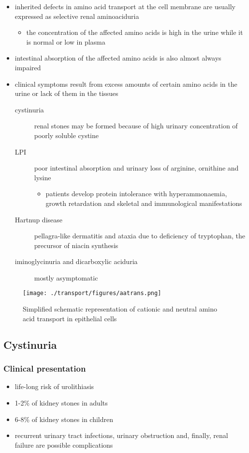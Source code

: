 \documentclass{scrartcl}
\begin{document}
\begin{itemize}
\item inherited defects in amino acid transport at the cell membrane are
usually expressed as selective renal aminoaciduria
\begin{itemize}
\item the concentration of the affected amino acids is high in the urine
while it is normal or low in plasma
\end{itemize}
\item intestinal absorption of the affected amino acids is also almost
always impaired
\item clinical symptoms result from excess amounts of certain amino acids
in the urine or lack of them in the tissues
\begin{description}
\item[{cystinuria}] renal stones may be formed because of high urinary
concentration of poorly soluble cystine
\item[{LPI}] poor intestinal absorption and urinary loss of arginine,
ornithine and lysine
\begin{itemize}
\item patients develop protein intolerance with hyperammonaemia,
growth retardation and skeletal and immunological manifestations
\end{itemize}
\item[{Hartnup disease}] pellagra-like dermatitis and ataxia due to
deficiency of tryptophan, the precursor of niacin synthesis
\item[{iminoglycinuria and dicarboxylic aciduria}] mostly asymptomatic
\end{description}
\end{itemize}


\begin{figure}[htbp]
\centering
\texttt{[image: ./transport/figures/aatrans.png]}
\caption{\label{fig:org0de824f}
Simplified schematic representation of cationic and neutral amino acid transport in epithelial cells}
\end{figure}

\subsection{Cystinuria}
\label{sec:org2fe15e8}
\subsubsection{Clinical presentation}
\label{sec:orgbbb1b4b}
\begin{itemize}
\item life-long risk of urolithiasis
\item 1-2\% of kidney stones in adults
\item 6-8\% of kidney stones in children
\item recurrent urinary tract infections, urinary obstruction and,
finally, renal failure are possible complications
\end{itemize}
\end{document}
